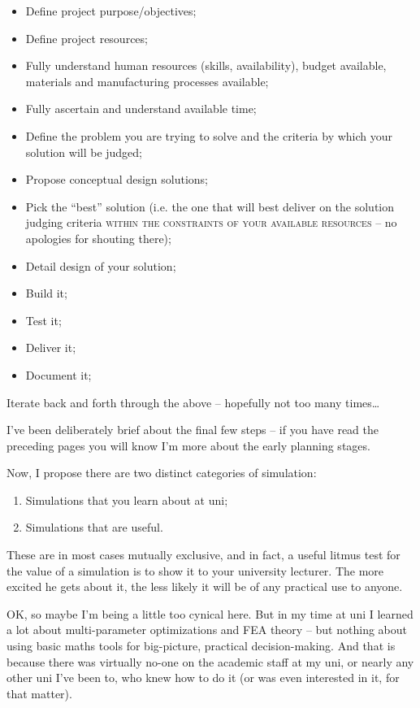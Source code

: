 \documentclass[10pt, a4paper, article, oneside, twocolumn, final]{memoir}
\begin{document}
\begin{itemize}
    \item Define project purpose/\allowbreak objectives;
    \item Define project resources;
    \item Fully understand human resources (skills, availability), budget available, materials and manufacturing processes available;
    \item Fully ascertain and understand available time;
    \item Define the problem you are trying to solve and the criteria by which your solution will be judged;
    \item Propose conceptual design solutions;
    \item Pick the “best” solution (i.e. the one that will best deliver on the solution judging criteria \textsc{within the constraints of your available resources} -- no apologies for shouting there);
    \item Detail design of your solution;
    \item Build it;
    \item Test it;
    \item Deliver it;
    \item Document it;
\end{itemize}

Iterate back and forth through the above -- hopefully not too many times\ldots

I’ve been deliberately brief about the final few steps -- if you have read the preceding pages you will know I’m more about the early planning stages. 

Now, I propose there are two distinct categories of simulation: 

\begin{enumerate}
    \item Simulations that you learn about at uni;
    \item Simulations that are useful.
\end{enumerate}

These are in most cases mutually exclusive, and in fact, a useful litmus test for the value of a simulation is to show it to your university lecturer. The more excited he gets about it, the less likely it will be of any practical use to anyone. 

OK, so maybe I’m being a little too cynical here. But in my time at uni I learned a lot about multi-parameter optimizations and FEA theory -- but nothing about using basic maths tools for big-picture, practical decision-making. And that is because there was virtually no-one on the academic staff at my uni, or nearly any other uni I’ve been to, who knew how to do it (or was even interested in it, for that matter).
\end{document}

